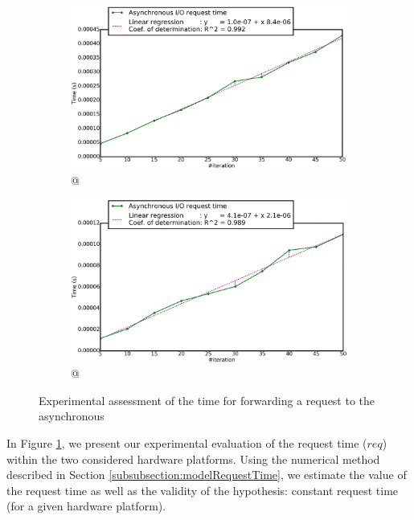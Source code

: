 				\begin{figure}[!h]
					\centering
					\begin{subfigure}[b]{0.475\textwidth}
						\centering
						\includegraphics[width=\textwidth]{charts/requestTimeExample_workstation_8core.png}
						\caption[\targetPlatformLaptop\space @ \targetPlatformLaptopFrequency]
						{{\small \targetPlatformLaptop\space @ \targetPlatformLaptopFrequency}}
					\end{subfigure}
					\hfill
					\begin{subfigure}[b]{0.475\textwidth}  
						\centering 
						\includegraphics[width=\textwidth]{charts/requestTimeExample_hpc.png}
						\caption[]%
						{{\small \targetPlatformHpc\space @ \targetPlatformHpcFrequency}}    
					\end{subfigure}
					\caption{Experimental assessment of the time for forwarding a request to the asynchronous \notationaioWriteThread}
					\label{fig:requestTimeExample}
				\end{figure}

			In Figure \ref{fig:requestTimeExample}, we present our experimental evaluation of the \notationaio\space request time ($req$) within the two considered hardware platforms.   Using the numerical method described in Section \ref{subsubsection:modelRequestTime}, we estimate the value of the request time as well as the validity of the hypothesis: constant request time (for a given hardware platform).

